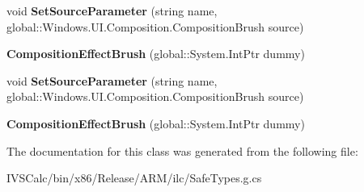 \begin{DoxyCompactItemize}
void {\bfseries Set\+Source\+Parameter} (string name, global\+::\+Windows.\+U\+I.\+Composition.\+Composition\+Brush source)
\item 
\mbox{\label{class_windows_1_1_u_i_1_1_composition_1_1_composition_effect_brush_a4c9a60de87d846228a8383ff2b8841ff}} 
{\bfseries Composition\+Effect\+Brush} (global\+::\+System.\+Int\+Ptr dummy)
\item 
\mbox{\label{class_windows_1_1_u_i_1_1_composition_1_1_composition_effect_brush_a6d36ccfc8c45b611dab63548deb0f116}} 
void {\bfseries Set\+Source\+Parameter} (string name, global\+::\+Windows.\+U\+I.\+Composition.\+Composition\+Brush source)
\item 
\mbox{\label{class_windows_1_1_u_i_1_1_composition_1_1_composition_effect_brush_a4c9a60de87d846228a8383ff2b8841ff}} 
{\bfseries Composition\+Effect\+Brush} (global\+::\+System.\+Int\+Ptr dummy)
\end{DoxyCompactItemize}


The documentation for this class was generated from the following file\+:\begin{DoxyCompactItemize}
\item 
I\+V\+S\+Calc/bin/x86/\+Release/\+A\+R\+M/ilc/Safe\+Types.\+g.\+cs\end{DoxyCompactItemize}
